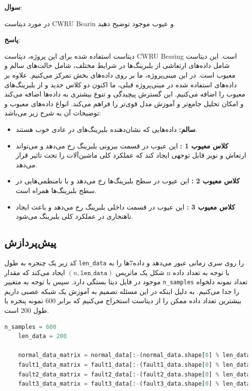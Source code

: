 \documentclass{article}
\begin{document}
{\large \textbf{سوال}:} 

در مورد دیتاست CWRU Bearin و عیوب موجود توضیح دهید. 

{\large \textbf{پاسخ}:} 

دیتاست استفاده شده برای این پروژه، دیتاست CWRU Bearing است. این دیتاست شامل داده‌های ارتعاشی از بلبرینگ‌ها در شرایط مختلف، شامل حالت‌های سالم و معیوب است. در این مینی‌پروژه، ما بر روی داده‌های بخش
 تمرکز می‌کنیم.
علاوه بر داده‌های استفاده شده در مینی‌پروژه قبلی، ما اکنون دو کلاس جدید
  و 
 از بلبرینگ‌های معیوب را اضافه می‌کنیم. این گسترش پیچیدگی و تنوع بیشتری به داده‌ها اضافه می‌کند و امکان تحلیل جامع‌تر و آموزش مدل قوی‌تر را فراهم می‌کند.
انواع داده‌های معیوب و توضیحات آن به شرح زیر می‌باشد:
\begin{itemize}
    \item \textbf{سالم:} داده‌هایی که نشان‌دهنده بلبرینگ‌های در عادی خوب هستند.
    \item \textbf{کلاس معیوب 1 :} این عیوب در قسمت بیرونی بلبرینگ رخ می‌دهد و می‌تواند ارتعاش و نویز قابل توجهی ایجاد کند که عملکرد کلی ماشین‌آلات را تحت تاثیر قرار می‌دهد.
    \item \textbf{کلاس معیوب 2 :} این عیوب در سطح بلبرینگ‌ها رخ می‌دهد و با نامنظمی‌هایی در سطح بلبرینگ‌ها همراه است.
    \item \textbf{کلاس معیوب 3 :} این عیوب در قسمت داخلی بلبرینگ رخ می‌دهد و باعث ایجاد ناهنجاری در عملکرد کلی بلبرینگ می‌شود.
\end{itemize}

\subsection{پیش‌پردازش}

کد زیر یک چنجره به طول 
\texttt{len\_data}
را روی سری زمانی عبور می‌دهد و داده7ها را به شکل یک ماتریس 
$(n, \texttt{len\_data})$
ایجاد می‌کند که مقدار n با توجه به تعداد داده موجود در فایل دیتا بستگی دارد. سپس با توجه به متغییر ‎\texttt{n‎\_samples} تعداد نمونه دلخواه را جدا می‌کنیم. به دلیل اینکه در این مسئله تصمیم به آموزش یک شبکه عصبی داریم بیشترین تعداد داده ممکن را از دیتاست استخراج می‌کنیم که برابر 600 نمونه پنجره با طول 200 است.‎
\begin{LTR}
	\begin{lstlisting}[language=Python, caption=Sliding Window]
	n_samples = 600
	len_data = 200
	
	normal_data_matrix = normal_data[:-(normal_data.shape[0] % len_data)].reshape(-1, len_data)
	fault1_data_matrix = fault1_data[:-(fault1_data.shape[0] % len_data)].reshape(-1, len_data)
	fault2_data_matrix = fault2_data[:-(fault2_data.shape[0] % len_data)].reshape(-1, len_data)
	fault3_data_matrix = fault3_data[:-(fault3_data.shape[0] % len_data)].reshape(-1, len_data)
	\end{lstlisting}
\end{LTR}
\end{document}
